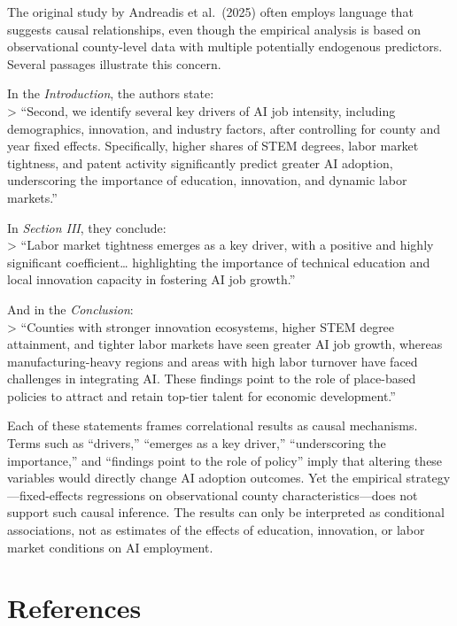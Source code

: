 \documentclass[
]{article}
\begin{document}
The original study by Andreadis et al.~(2025) often employs language
that suggests causal relationships, even though the empirical analysis
is based on observational county-level data with multiple potentially
endogenous predictors. Several passages illustrate this concern.

In the \emph{Introduction}, the authors state:\\
\textgreater{} ``Second, we identify several key drivers of AI job
intensity, including demographics, innovation, and industry factors,
after controlling for county and year fixed effects. Specifically,
higher shares of STEM degrees, labor market tightness, and patent
activity significantly predict greater AI adoption, underscoring the
importance of education, innovation, and dynamic labor markets.''

In \emph{Section III}, they conclude:\\
\textgreater{} ``Labor market tightness emerges as a key driver, with a
positive and highly significant coefficient\ldots{} highlighting the
importance of technical education and local innovation capacity in
fostering AI job growth.''

And in the \emph{Conclusion}:\\
\textgreater{} ``Counties with stronger innovation ecosystems, higher
STEM degree attainment, and tighter labor markets have seen greater AI
job growth, whereas manufacturing-heavy regions and areas with high
labor turnover have faced challenges in integrating AI. These findings
point to the role of place-based policies to attract and retain top-tier
talent for economic development.''

Each of these statements frames correlational results as causal
mechanisms. Terms such as ``drivers,'' ``emerges as a key driver,''
``underscoring the importance,'' and ``findings point to the role of
policy'' imply that altering these variables would directly change AI
adoption outcomes. Yet the empirical strategy---fixed-effects
regressions on observational county characteristics---does not support
such causal inference. The results can only be interpreted as
conditional associations, not as estimates of the effects of education,
innovation, or labor market conditions on AI employment.

\section*{References}\label{references}
\end{document}
